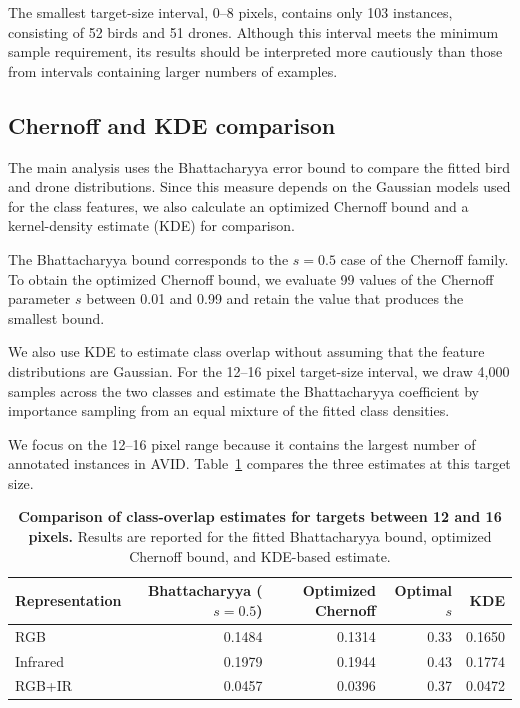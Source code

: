 \documentclass[10pt]{article}
\newcommand{\dataset}{\textsc{AVID}}
\begin{document}
The smallest target-size interval, 0--8 pixels, contains only 103 instances, consisting of 52 birds and 51 drones. Although this interval meets the minimum sample requirement, its results should be interpreted more cautiously than those from intervals containing larger numbers of examples.

\subsection{Chernoff and KDE comparison}

The main analysis uses the Bhattacharyya error bound to compare the fitted bird and drone distributions. Since this measure depends on the Gaussian models used for the class features, we also calculate an optimized Chernoff bound and a kernel-density estimate (KDE) for comparison.

The Bhattacharyya bound corresponds to the $s=0.5$ case of the Chernoff family. To obtain the optimized Chernoff bound, we evaluate 99 values of the Chernoff parameter $s$ between 0.01 and 0.99 and retain the value that produces the smallest bound.

We also use KDE to estimate class overlap without assuming that the feature distributions are Gaussian. For the 12--16 pixel target-size interval, we draw 4,000 samples across the two classes and estimate the Bhattacharyya coefficient by importance sampling from an equal mixture of the fitted class densities.

We focus on the 12--16 pixel range because it contains the largest number of annotated instances in \dataset{}. Table~\ref{tab:crosschecks} compares the three estimates at this target size.

\begin{table}[h]
\centering
\caption{\textbf{Comparison of class-overlap estimates for targets between 12 and 16 pixels.}
Results are reported for the fitted Bhattacharyya bound, optimized Chernoff bound, and KDE-based estimate.}
\label{tab:crosschecks}
\small
\begin{tabular}{lrrrr}
\toprule
Representation
& Bhattacharyya ($s=0.5$)
& Optimized Chernoff
& Optimal $s$
& KDE \\
\midrule
RGB
& 0.1484 & 0.1314 & 0.33 & 0.1650 \\
Infrared
& 0.1979 & 0.1944 & 0.43 & 0.1774 \\
RGB+IR
& 0.0457 & 0.0396 & 0.37 & 0.0472 \\
\bottomrule
\end{tabular}
\end{table}
\end{document}
